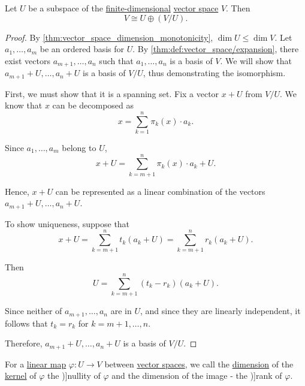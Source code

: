 \begin{proposition}\label{thm:rank_nullity_via_subspaces}
  Let \( U \) be a subspace of the \hyperref[thm:vector_space_dimension]{finite-dimensional} \hyperref[def:vector_space]{vector space} \( V \). Then
  \begin{equation*}
    V \cong U \oplus (V / U).
  \end{equation*}
\end{proposition}
\begin{proof}
  By \cref{thm:vector_space_dimension_monotonicity}, \( \dim U \leq \dim V \). Let \( a_1, \ldots, a_m \) be an ordered basis for \( U \). By \cref{thm:def:vector_space/expansion}, there exist vectors \( a_{m+1}, \ldots, a_n \) such that \( a_1, \ldots, a_n \) is a basis of \( V \). We will show that \( a_{m+1} + U, \ldots, a_n + U \) is a basis of \( V / U \), thus demonstrating the isomorphism.

  First, we must show that it is a spanning set. Fix a vector \( x + U \) from \( V / U \). We know that \( x \) can be decomposed as
  \begin{equation*}
    x = \sum_{k=1}^n \pi_k(x) \cdot a_k.
  \end{equation*}

  Since \( a_1, \ldots, a_m \) belong to \( U \),
  \begin{equation*}
    x + U = \sum_{k={m+1}}^n \pi_k(x) \cdot a_k + U.
  \end{equation*}

  Hence, \( x + U \) can be represented as a linear combination of the vectors \( a_{m+1} + U, \ldots, a_n + U \).

  To show uniqueness, suppose that
  \begin{equation*}
    x + U = \sum_{k={m+1}}^n t_k (a_k + U) = \sum_{k={m+1}}^n r_k (a_k + U).
  \end{equation*}

  Then
  \begin{equation*}
    U = \sum_{k={m+1}}^n (t_k - r_k) (a_k + U).
  \end{equation*}

  Since neither of \( a_{m+1}, \ldots, a_n \) are in \( U \), and since they are linearly independent, it follows that \( t_k = r_k \) for \( k = m + 1, \ldots, n \).

  Therefore, \( a_{m+1} + U, \ldots, a_n + U \) is a basis of \( V / U \).
\end{proof}

\begin{definition}\label{def:rank_and_nullity}
  For a \hyperref[def:linear_function]{linear map} \( \varphi: U \to V \) between \hyperref[def:vector_space]{vector spaces}, we call the \hyperref[def:vector_space_dimension]{dimension} of the \hyperref[def:vector_space/kernel]{kernel} of \( \varphi \) the \term[ru=дефект (\cite[250]{Тыртышников2007ЛинейнаяАлгебра})]{nullity} of \( \varphi \) and the dimension of the image - the \term[ru=ранг (\cite[250]{Тыртышников2007ЛинейнаяАлгебра})]{rank} of \( \varphi \).
\end{definition}

